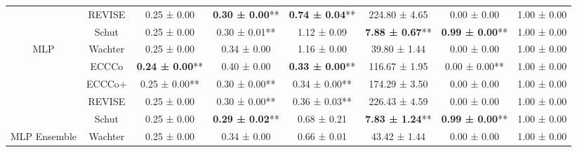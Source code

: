 \begin{table}
{\begin{tabular}[t]{cccccccc}
 & REVISE & 0.25 ± 0.00\hphantom{*}\hphantom{*} & \textbf{0.30 ± 0.00}** & \textbf{0.74 ± 0.04}** & 224.80 ± 4.65\hphantom{*}\hphantom{*} & 0.00 ± 0.00\hphantom{*}\hphantom{*} & 1.00 ± 0.00\hphantom{*}\hphantom{*}\\

 & Schut & 0.25 ± 0.00\hphantom{*}\hphantom{*} & 0.30 ± 0.01** & 1.12 ± 0.09\hphantom{*}\hphantom{*} & \textbf{7.88 ± 0.67}** & \textbf{0.99 ± 0.00}** & 1.00 ± 0.00\hphantom{*}\hphantom{*}\\

\multirow[t]{-5}{*}{\centering\arraybackslash MLP} & Wachter & 0.25 ± 0.00\hphantom{*}\hphantom{*} & 0.34 ± 0.00\hphantom{*}\hphantom{*} & 1.16 ± 0.00\hphantom{*}\hphantom{*} & 39.80 ± 1.44\hphantom{*}\hphantom{*} & 0.00 ± 0.00\hphantom{*}\hphantom{*} & 1.00 ± 0.00\hphantom{*}\hphantom{*}\\
\cmidrule{1-8}
 & ECCCo & \textbf{0.24 ± 0.00}** & 0.40 ± 0.00\hphantom{*}\hphantom{*} & \textbf{0.33 ± 0.00}** & 116.67 ± 1.95\hphantom{*}\hphantom{*} & 0.00 ± 0.00** & 1.00 ± 0.00\hphantom{*}\hphantom{*}\\

 & ECCCo+ & 0.25 ± 0.00** & 0.30 ± 0.00** & 0.34 ± 0.00** & 174.29 ± 3.50\hphantom{*}\hphantom{*} & 0.00 ± 0.00\hphantom{*}\hphantom{*} & 1.00 ± 0.00\hphantom{*}\hphantom{*}\\

 & REVISE & 0.25 ± 0.00\hphantom{*}\hphantom{*} & 0.30 ± 0.00** & 0.36 ± 0.03** & 226.43 ± 4.59\hphantom{*}\hphantom{*} & 0.00 ± 0.00\hphantom{*}\hphantom{*} & 1.00 ± 0.00\hphantom{*}\hphantom{*}\\

 & Schut & 0.25 ± 0.00\hphantom{*}\hphantom{*} & \textbf{0.29 ± 0.02}** & 0.68 ± 0.21\hphantom{*}\hphantom{*} & \textbf{7.83 ± 1.24}** & \textbf{0.99 ± 0.00}** & 1.00 ± 0.00\hphantom{*}\hphantom{*}\\

\multirow[t]{-5}{*}{\centering\arraybackslash MLP Ensemble} & Wachter & 0.25 ± 0.00\hphantom{*}\hphantom{*} & 0.34 ± 0.00\hphantom{*}\hphantom{*} & 0.66 ± 0.01\hphantom{*}\hphantom{*} & 43.42 ± 1.44\hphantom{*}\hphantom{*} & 0.00 ± 0.00\hphantom{*}\hphantom{*} & 1.00 ± 0.00\hphantom{*}\hphantom{*}\\
\bottomrule
\end{tabular}}
\end{table}
